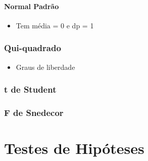 \documentclass[
  letterpaper,
  DIV=11,
  numbers=noendperiod]{scrreprt}
\let\oldparagraph\paragraph
\renewcommand{\paragraph}[1]{\oldparagraph{#1}\mbox{}}
\providecommand{\tightlist}{%
  \setlength{\itemsep}{0pt}\setlength{\parskip}{0pt}}\usepackage{longtable,booktabs,array}
\begin{document}
\hypertarget{normal-padruxe3o}{%
\paragraph{Normal Padrão}\label{normal-padruxe3o}}

\begin{itemize}
\tightlist
\item
  Tem média = 0 e dp = 1
\end{itemize}

\hypertarget{qui-quadrado}{%
\subsubsection{Qui-quadrado}\label{qui-quadrado}}

\begin{itemize}
\tightlist
\item
  Graus de liberdade
\end{itemize}

\hypertarget{t-de-student}{%
\subsubsection{t de Student}\label{t-de-student}}

\hypertarget{f-de-snedecor}{%
\subsubsection{F de Snedecor}\label{f-de-snedecor}}

\hypertarget{testes-de-hipuxf3teses}{%
\section{Testes de Hipóteses}\label{testes-de-hipuxf3teses}}
\end{document}
